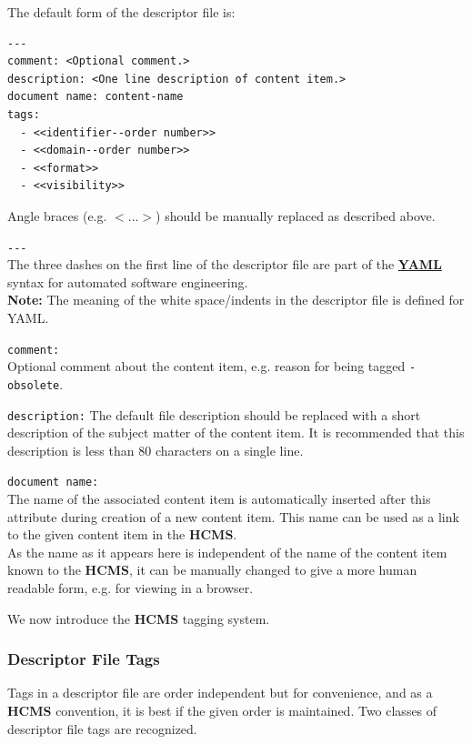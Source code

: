 \documentclass[12pt]{article}
\begin{document}
The default form of the descriptor file is:
\begin{verbatim}
---
comment: <Optional comment.>
description: <One line description of content item.>
document name: content-name
tags:
  - <<identifier--order number>>
  - <<domain--order number>>
  - <<format>>
  - <<visibility>>
\end{verbatim}
Angle braces (e.g. {\small{$<\ldots>$}}) should be manually replaced as described above.
\begin{description}
\item{\tt -{}-{}-}\\
The three dashes on the first line of the descriptor file are part of the \href{http://yaml.org}{\bf \small YAML} syntax for automated software engineering. \\
{\bf Note:} The meaning of the white space/indents in the descriptor file is defined for YAML.
\item{\tt comment:}\\
Optional comment about the content item, e.g. reason for being tagged {\tt -\,obsolete}.
\item{\tt description:} The default file description should be replaced with a short description of the subject matter of the content item. It is recommended that this description is less than 80 characters on a single line.
\item[]{\tt document\,name:}\\
The name of the associated content item is automatically inserted after this attribute during creation of a new content item. This name can be used as a link to the given content item in the {\bf \small HCMS}.\\
As the name as it appears here is independent of the name of the content item known to the {\bf \small HCMS}, it can be manually changed to give a more human readable form, e.g. for viewing in a browser.
\end{description}

We now introduce the {\bf \small HCMS} tagging system.

\subsubsection{Descriptor File Tags}

Tags in a descriptor file are order independent but for convenience, and as a {\bf \small HCMS} convention, it is best if the given order is maintained. Two classes of descriptor file tags are recognized. 
\end{document}
